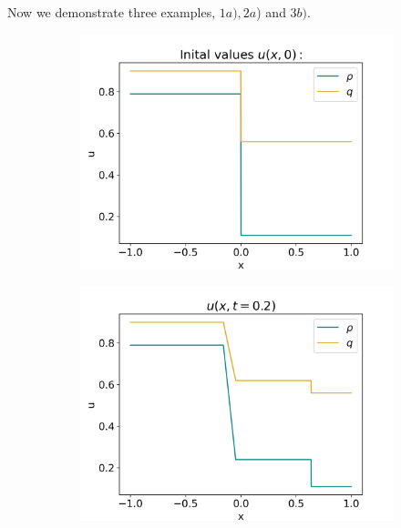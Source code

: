 \documentclass[10pt]{article}
\numberwithin{equation}{section}
\begin{document}
Now we demonstrate three examples, $1a), 2a$) and $3b)$. 
\begin{figure}[H]
     \centering
     \begin{subfigure}[t]{0.35\textwidth}
         \centering
         \includegraphics[width=\textwidth]{Figures/Model/Plots/Sys1aIV.png}
     \end{subfigure}
     \begin{subfigure}[t]{0.35\textwidth}
         \centering
         \includegraphics[width=\textwidth]{Figures/Model/Plots/Sys1aAtTime.png}
     \end{subfigure}
     \hfill
     \begin{subfigure}[b]{0.35\textwidth}
         \centering

\end{subfigure}
\end{figure}
\end{document}
